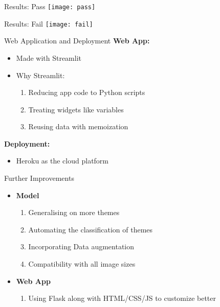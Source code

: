 \documentclass[12pt]{beamer}
\begin{document}
\begin{frame}{Results: Pass}
	\texttt{[image: pass]}
\end{frame}

\begin{frame}{Results: Fail}
	\texttt{[image: fail]}
\end{frame}

\begin{frame}{Web Application and Deployment}
	\textbf{Web App:}\\
	\begin{itemize}
		\item Made with Streamlit\\
		\item Why Streamlit:\\
			\begin{enumerate}
				\item Reducing app code to Python scripts
				\item Treating widgets like variables
				\item Reusing data with memoization
			\end{enumerate}
	\end{itemize}
	\textbf{Deployment:}
	\begin{itemize}
		\item Heroku as the cloud platform
	\end{itemize}
\end{frame}

\begin{frame}{Further Improvements}
	\begin{itemize}
		\item \textbf{Model}
			\begin{enumerate}
				\item Generalising on more themes
				\item Automating the classification of themes
				\item Incorporating Data augmentation
				\item Compatibility with all image sizes
			\end{enumerate}
		\item \textbf{Web App}
			\begin{enumerate}
				\item Using Flask along with HTML/CSS/JS to customize better
			\end{enumerate}
	\end{itemize}
\end{frame}
\end{document}
